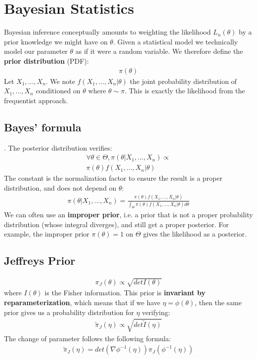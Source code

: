 \section{Bayesian Statistics}
Bayesian inference conceptually amounts to weighting the likelihood $L_n(\theta)$ by a prior knowledge we might have on $\theta$.
Given a statistical model we technically model our parameter $\theta$ as if it were a random variable. We therefore define the \textbf{prior distribution} (PDF):
\begin{align*}
\pi(\theta)
\end{align*}
Let $X_1,...,X_n$. We note $f(X_1,...,X_n|\theta)$ the joint probability distribution of $X_1,...,X_n$ conditioned on $\theta$ where $\theta \sim \pi$. This is exactly the likelihood from the frequentist approach.
\subsection{Bayes' formula}. 
The {posterior distribution} verifies:
\begin{align*}
\forall \theta \in \Theta, \pi(\theta|X_1,...,X_n) \propto\\ \pi(\theta)f(X_1,...,X_n | \theta)
\end{align*}
The constant is the normalization factor to ensure the result is a proper distribution, and does not depend on $\theta$:
\begin{align*}
\pi(\theta|X_1,...,X_n) = \frac{\pi(\theta)f(X_1,...,X_n | \theta)}{\int_\Theta\pi(\theta)f(X_1,...,X_n | \theta)d\theta}
\end{align*}
We can often use an \textbf{improper prior}, i.e. a prior that is not a proper probability distribution (whose integral diverges), and still get a proper posterior. For example, the improper prior $\pi(\theta) = 1$ on $\Theta$ gives the likelihood as a posterior.
\subsection{Jeffreys Prior}
\begin{align*}
\pi_J(\theta) \propto \sqrt{det I(\theta)}
\end{align*}
where $I(\theta)$ is the Fisher information. This prior is \textbf{invariant by reparameterization}, which means that if we have $\eta = \phi(\theta)$, then the same prior gives us a probability distribution for $\eta$ verifying:
\begin{align*}
\tilde\pi_J(\eta) \propto \sqrt{det \tilde I(\eta)}
\end{align*}
The change of parameter follows the following formula:
\begin{align*}
\tilde\pi_J(\eta) = det(\nabla \phi^{-1}(\eta)) \pi_J(\phi^{-1}(\eta))
\end{align*}
